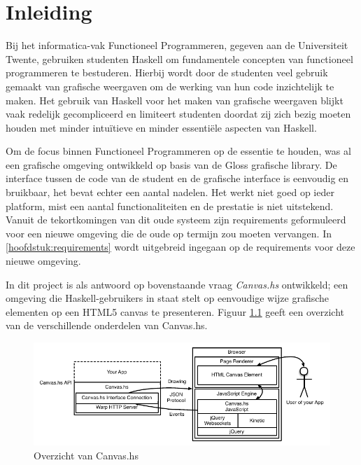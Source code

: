 \chapter{Inleiding}
Bij het informatica-vak Functioneel Programmeren, gegeven aan de Universiteit Twente, gebruiken studenten Haskell om fundamentele concepten van functioneel programmeren te bestuderen. Hierbij wordt door de studenten veel gebruik gemaakt van grafische weergaven om de werking van hun code inzichtelijk te maken. Het gebruik van Haskell voor het maken van grafische weergaven blijkt vaak redelijk gecompliceerd en limiteert studenten doordat zij zich bezig moeten houden met minder intuïtieve en minder essentiële aspecten van Haskell.

Om de focus binnen Functioneel Programmeren op de essentie te houden, was al een grafische omgeving ontwikkeld op basis van de Gloss grafische library. De interface tussen de code van de student en de grafische interface is eenvoudig en bruikbaar, het bevat echter een aantal nadelen. Het werkt niet goed op ieder platform, mist een aantal functionaliteiten en de prestatie is niet uitstekend. Vanuit de tekortkomingen van dit oude systeem zijn requirements geformuleerd voor een nieuwe omgeving die de oude op termijn zou moeten vervangen. In \autoref{hoofdstuk:requirements} wordt uitgebreid ingegaan op de requirements voor deze nieuwe omgeving.

In dit project is als antwoord op bovenstaande vraag \emph{Canvas.hs} ontwikkeld; een omgeving die Haskell-gebruikers in staat stelt op eenvoudige wijze grafische elementen op een HTML5 canvas te presenteren. Figuur \ref{fig:overzicht_canvas.hs} geeft een overzicht van de verschillende onderdelen van Canvas.hs.

\begin{figure}
\begin{center}
\includegraphics[keepaspectratio,width=\textwidth]{./images/architectuur_overzicht.pdf}
\caption{Overzicht  van Canvas.hs}
\label{fig:overzicht_canvas.hs}
\end{center}
\end{figure}


